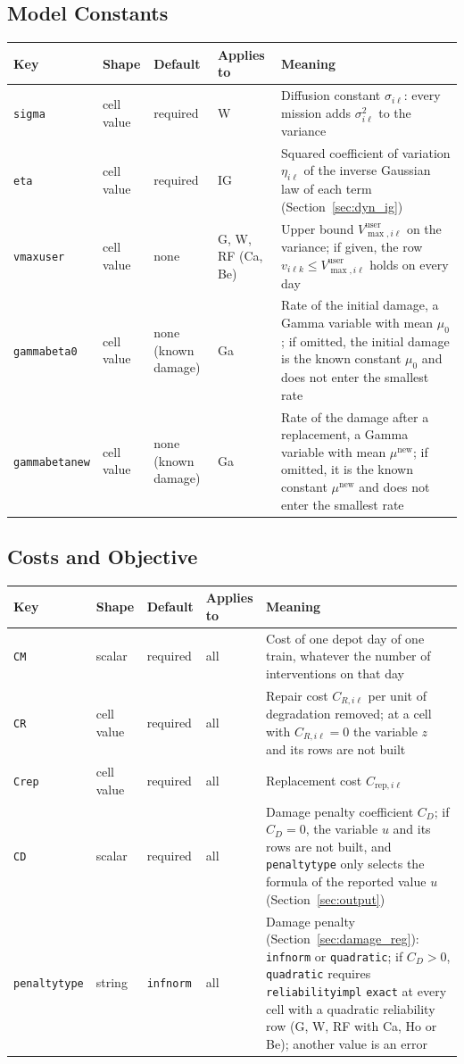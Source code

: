 \documentclass[11pt,a4paper]{article}
\makeatletter
\theoremstyle{plain}
\theoremstyle{definition}
\newcommand{\new}{\mathrm{new}}
\renewcommand{\_}{\textunderscore\allowbreak{}}
\providecommand{\keyrow}[5]{{\raggedright #1\par} & {\raggedright #2\par} & {\raggedright #3\par} & {\raggedright #4\par} & {\raggedright #5\par} \\}
\providecommand{\tabstart}[2]{\begingroup\small\begin{longtable}{@{}#1@{}}\toprule #2 \\ \midrule \endhead}
\providecommand{\tabend}{\bottomrule\end{longtable}\endgroup}
\providecommand{\keytab}{\tabstart{p{3.2cm}p{2.2cm}p{1.8cm}p{1.9cm}p{4.5cm}}{Key & Shape & Default & Applies to & Meaning}}
\makeatother
\begin{document}
\subsection{Model Constants}\label{sec:input_constants}

\keytab
\keyrow{\texttt{sigma}}{cell value}{required}{W}{Diffusion constant $\sigma_{i\ell}$: every mission adds $\sigma_{i\ell}^2$ to the variance}
\keyrow{\texttt{eta}}{cell value}{required}{IG}{Squared coefficient of variation $\eta_{i\ell}$ of the inverse Gaussian law of each term (Section~\ref{sec:dyn_ig})}
\keyrow{\texttt{v\_max\_user}}{cell value}{none}{G, W, RF (Ca, Be)}{Upper bound $V^{\mathrm{user}}_{\max,i\ell}$ on the variance; if given, the row $v_{i\ell k} \le V^{\mathrm{user}}_{\max,i\ell}$ holds on every day}
\keyrow{\texttt{gamma\_beta\_0}}{cell value}{none (known damage)}{Ga}{Rate of the initial damage, a Gamma variable with mean $\mu_0$; if omitted, the initial damage is the known constant $\mu_0$ and does not enter the smallest rate}
\keyrow{\texttt{gamma\_beta\_new}}{cell value}{none (known damage)}{Ga}{Rate of the damage after a replacement, a Gamma variable with mean $\mu^{\new}$; if omitted, it is the known constant $\mu^{\new}$ and does not enter the smallest rate}
\tabend

\subsection{Costs and Objective}\label{sec:input_costs}

\keytab
\keyrow{\texttt{C\_M}}{scalar}{required}{all}{Cost of one depot day of one train, whatever the number of interventions on that day}
\keyrow{\texttt{C\_R}}{cell value}{required}{all}{Repair cost $C_{R,i\ell}$ per unit of degradation removed; at a cell with $C_{R,i\ell} = 0$ the variable $z$ and its rows are not built}
\keyrow{\texttt{C\_rep}}{cell value}{required}{all}{Replacement cost $C_{\mathrm{rep},i\ell}$}
\keyrow{\texttt{C\_D}}{scalar}{required}{all}{Damage penalty coefficient $C_D$; if $C_D = 0$, the variable $u$ and its rows are not built, and \texttt{penalty\_type} only selects the formula of the reported value $u$ (Section~\ref{sec:output})}
\keyrow{\texttt{penalty\_type}}{string}{\texttt{inf\_norm}}{all}{Damage penalty (Section~\ref{sec:damage_reg}): \texttt{inf\_norm} or \texttt{quadratic}; if $C_D > 0$, \texttt{quadratic} requires \texttt{reliability\_impl} \texttt{exact} at every cell with a quadratic reliability row (G, W, RF with Ca, Ho or Be); another value is an error}
\tabend
\end{document}
